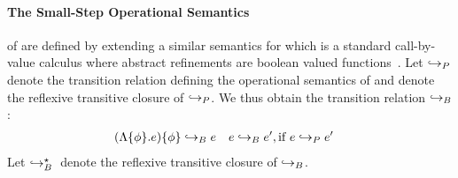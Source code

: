 \begin{comment}
Definition of \erase{\dot}:

\begin{align*}
\erase{x}                      &= x \\
\erase{c}                      &= c\\
\erase{\eapp{e_1}{e_2}}        &= \eapp{\erase{e_1}}{\erase{e_2}}\\
\erase{\etabs{\alpha}{e}}      &= \etabs{\alpha}{\erase{e}}\\
\erase{\etapp{e}{\tau}}        &= \etapp{\erase{e}}{\erase{\tau}}\\
\erase{\epabs{\rvar}{\tau}{e}} &= \epabs{\rvar}{\erase{\tau}}{\erase{e}}\\
\erase{\epapp{e_1}{e_2}}           &= \epapp{\erase{e_1}}{\erase{e_2}}\\
%
\erase{\elet{x}{e_x}{e}{\tau}} &= \elet{x}{\erase{e_x}}{\erase{e}}{\erase{\tau}}\\
%
\erase{\econstraint{\phi}{e}}  &= \erase{e}\\
\erase{\econstantconstraint{e}{\phi}} &= \erase{e}
\end{align*}

\begin{definition}%
$ e\boundedgoestostar{c} \Leftrightarrow {\erase{e}}\goestostar{c} $.
\end{definition}

The below does not hold:
\begin{lemma*}[Operational]%
\label{theorem:operational}
If
   $\vdash_{B} e : \tau$ and
   $\txexpr{\emptyset}{\emptyset}{e}{e'}$
then
   $\erase{e} \goestostar{c} \Leftrightarrow {e'} \goestostar{c} $.
\end{lemma*}

Counterexample e = \{φ} =>  0

\end{comment}

\paragraph{The Small-Step Operational Semantics} of \boundedcorelan
are defined by extending a similar semantics for \corelan
which is a standard call-by-value calculus where abstract
refinements are boolean valued functions~\cite{vazou13}.
%
Let $\hookrightarrow_P$ denote the transition relation defining
the operational semantics of \corelan and \tclos{\stepcore}
denote the reflexive transitive closure of $\hookrightarrow_P$.
%
We thus obtain the transition relation $\hookrightarrow_B$:
%
\begin{align*}
 (\Lambda \{\phi \} . e ) \{ \phi \}  &\hookrightarrow_B {e} &
e  & \hookrightarrow_B e', \text{if}\ {e \hookrightarrow_P e'}
\end{align*}
%
Let $\hookrightarrow_B^{\star} {} $ denote the reflexive transitive
closure of $\hookrightarrow_B$.

